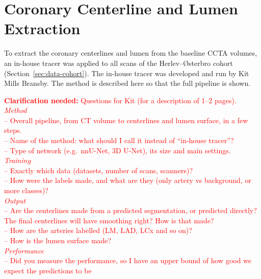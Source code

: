 
\newpage

\providecommand{\clarify}[1]{\textcolor{red}{\textbf{Clarification needed:} #1}}
\providecommand{\ask}[1]{\textcolor{red}{[#1]}}
\section{Coronary Centerline and Lumen Extraction}
\label{sec:method-tracer}

To extract the coronary centerlines and lumen from the baseline CCTA volumes, an in-house tracer was applied to all scans of the Herlev--{\O}sterbro cohort (Section~\ref{sec:data-cohort}). The in-house tracer was developed and run by Kit Mills Bransby. The method is described here so that the full pipeline is shown. 


\clarify{Questions for Kit (for a description of 1--2 pages).\\
\textit{Method}\\
-- Overall pipeline, from CT volume to centerlines and lumen surface, in a few steps.\\
-- Name of the method: what should I call it instead of ``in-house tracer''?\\
-- Type of network (e.g.\ nnU-Net, 3D U-Net), its size and main settings.\\
\textit{Training}\\
-- Exactly which data (datasets, number of scans, scanners)?\\
-- How were the labels made, and what are they (only artery vs background, or more classes)?\\
\textit{Output}\\
-- Are the centerlines made from a predicted segmentation, or predicted directly? The final centerlines will have smoothing right? How is that made?\\
-- How are the arteries labelled (LM, LAD, LCx and so on)?\\
-- How is the lumen surface made?\\
\textit{Performance}\\
-- Did you measure the performance, so I have an upper bound of how good we expect the predictions to be}
